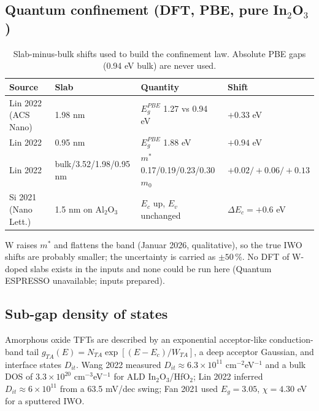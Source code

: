 \documentclass[11pt,a4paper]{article}
\begin{document}
\subsection{Quantum confinement (DFT, PBE, pure In$_2$O$_3$)}
\begin{table}[H]\centering\small
\caption{Slab-minus-bulk shifts used to build the confinement law. Absolute PBE gaps (0.94 eV bulk) are never used.}
\begin{tabular}{llll}\toprule
Source & Slab & Quantity & Shift\\\midrule
Lin 2022 (ACS Nano) & 1.98 nm & $E_g^{PBE}$ 1.27 vs 0.94 eV & $+0.33$ eV\\
Lin 2022 & 0.95 nm & $E_g^{PBE}$ 1.88 eV & $+0.94$ eV\\
Lin 2022 & bulk/3.52/1.98/0.95 nm & $m^*$ 0.17/0.19/0.23/0.30 $m_0$ & $+0.02/+0.06/+0.13$\\
Si 2021 (Nano Lett.) & 1.5 nm on Al$_2$O$_3$ & $E_c$ up, $E_v$ unchanged & $\Delta E_c=+0.6$ eV\\
\bottomrule\end{tabular}
\end{table}
W raises $m^*$ and flattens the band (Januar 2026, qualitative), so the true IWO shifts are probably smaller; the uncertainty is carried as $\pm50$\,\%. No DFT of W-doped slabs exists in the inputs and none could be run here (Quantum ESPRESSO unavailable; inputs prepared).

\subsection{Sub-gap density of states}
Amorphous oxide TFTs are described by an exponential acceptor-like conduction-band tail $g_{TA}(E)=N_{TA}\exp[(E-E_c)/W_{TA}]$, a deep acceptor Gaussian, and interface states $D_{it}$. Wang 2022 measured $D_{it}\approx6.3\times10^{11}$ cm$^{-2}$eV$^{-1}$ and a bulk DOS of $3.3\times10^{20}$ cm$^{-3}$eV$^{-1}$ for ALD In$_2$O$_3$/HfO$_2$; Lin 2022 inferred $D_{it}\approx6\times10^{11}$ from a 63.5 mV/dec swing; Fan 2021 used $E_g=3.05$, $\chi=4.30$ eV for a sputtered IWO.
\end{document}

